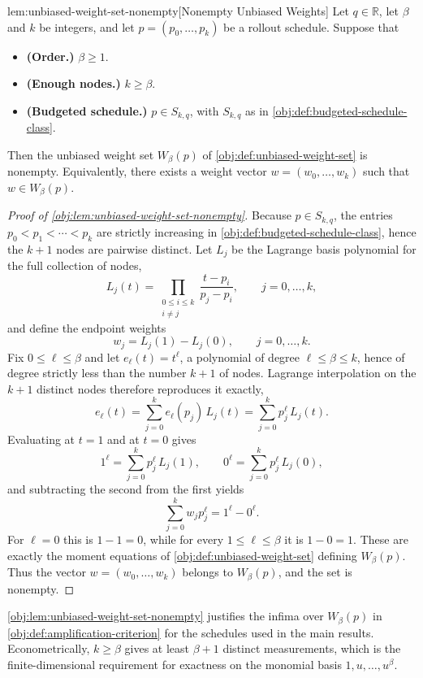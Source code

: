 \documentclass[11pt]{article}
\begin{document}
\begin{lemmav}{lem:unbiased-weight-set-nonempty}[Nonempty Unbiased Weights]
Let \(q\in\mathbb R\), let \(\beta\) and \(k\) be integers, and let \(p=(p_0,\ldots,p_k)\) be a rollout schedule. Suppose that
\begin{itemize}
\item \textbf{(Order.)} \(\beta\ge 1\).
\item \textbf{(Enough nodes.)} \(k\ge \beta\).
\item \textbf{(Budgeted schedule.)} \(p\in S_{k,q}\), with \(S_{k,q}\) as in \cref{obj:def:budgeted-schedule-class}.
\end{itemize}
Then the unbiased weight set \(W_\beta(p)\) of \cref{obj:def:unbiased-weight-set} is nonempty. Equivalently, there exists a weight vector \(w=(w_0,\ldots,w_k)\) such that \(w\in W_\beta(p)\).
\end{lemmav}

\begin{proof}[Proof of \cref{obj:lem:unbiased-weight-set-nonempty}]
Because \(p\in S_{k,q}\), the entries \(p_0<p_1<\cdots<p_k\) are strictly increasing in \cref{obj:def:budgeted-schedule-class}, hence the \(k+1\) nodes are pairwise distinct. Let \(L_j\) be the Lagrange basis polynomial for the full collection of nodes,
\[
L_j(t)=\prod_{\substack{0\le i\le k\\ i\ne j}}\frac{t-p_i}{p_j-p_i},
\qquad j=0,\ldots,k,
\]
and define the endpoint weights
\[
w_j=L_j(1)-L_j(0),
\qquad j=0,\ldots,k.
\] %
Fix \(0\le \ell\le\beta\) and let \(e_\ell(t)=t^\ell\), a polynomial of degree \(\ell\le\beta\le k\), hence of degree strictly less than the number \(k+1\) of nodes. Lagrange interpolation on the \(k+1\) distinct nodes therefore reproduces it exactly,
\[
e_\ell(t)=\sum_{j=0}^k e_\ell(p_j)\,L_j(t)
=\sum_{j=0}^k p_j^\ell\,L_j(t).
\]
Evaluating at \(t=1\) and at \(t=0\) gives
\[
1^\ell=\sum_{j=0}^k p_j^\ell\,L_j(1),
\qquad
0^\ell=\sum_{j=0}^k p_j^\ell\,L_j(0),
\]
and subtracting the second from the first yields
\[
\sum_{j=0}^k w_j p_j^\ell
=
1^\ell-0^\ell.
\] %
For \(\ell=0\) this is \(1-1=0\), while for every \(1\le\ell\le\beta\) it is \(1-0=1\). These are exactly the moment equations of \cref{obj:def:unbiased-weight-set} defining \(W_\beta(p)\). Thus the vector \(w=(w_0,\ldots,w_k)\) belongs to \(W_\beta(p)\), and the set is nonempty. %
\end{proof}

\cref{obj:lem:unbiased-weight-set-nonempty} justifies the infima over \(W_\beta(p)\) in \cref{obj:def:amplification-criterion} for the schedules used in the main results. Econometrically, \(k\ge\beta\) gives at least \(\beta+1\) distinct measurements, which is the finite-dimensional requirement for exactness on the monomial basis \(1,u,\ldots,u^\beta\).
\end{document}
